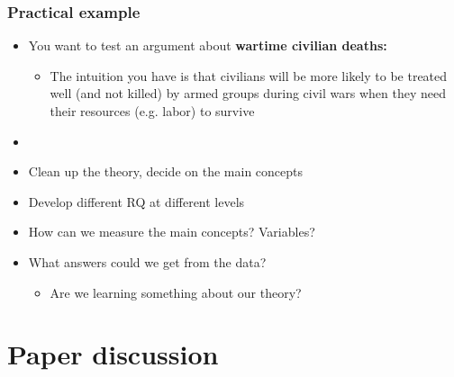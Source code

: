 \documentclass[aspectratio=43]{beamer}
\begin{document}
\begin{frame}
\frametitle{Practical example}
\centering

\begin{itemize}
  \item You want to test an argument about \textbf{wartime civilian deaths:}
  \begin{itemize}
    \item The intuition you have is that civilians will be more likely to be treated well (and not killed) by armed groups during civil wars when they need their resources (e.g. labor) to survive
  \end{itemize}
  \item[]
  \item Clean up the theory, decide on the main concepts
  \item Develop different RQ at different levels
  \item How can we measure the main concepts? Variables?
  \item What answers could we get from the data?
    \begin{itemize}
      \item Are we learning something about our theory?
    \end{itemize}
\end{itemize}

\end{frame}

\section{Paper discussion}


\end{document}

